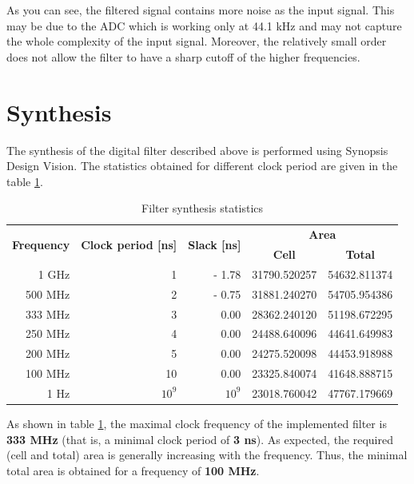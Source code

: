 As you can see, the filtered signal contains more noise as the input signal. This may be due to the ADC which is working only at 44.1 kHz and may not capture the whole complexity of the input signal. Moreover, the relatively small order does not allow the filter to have a sharp cutoff of the higher frequencies.


\section{Synthesis}

The synthesis of the digital filter described above is performed using Synopsis Design Vision. The statistics obtained for different clock period are given in the table \ref{table:synthesisStats}.

\begin{table}[!h]
	\centering
	\begin{tabular}{|r|r|r|r|r|}
		\hline
		 \multirow{2}{*}{\textbf{Frequency}}
		 & \multirow{2}{*}{\textbf{Clock period [ns]}}
		 & \multirow{2}{*}{\textbf{Slack [ns]}} & \multicolumn{2}{c|}{\textbf{Area}} \\
		 \cline{4-5}
		 & & & \multicolumn{1}{c|}{\textbf{Cell}} & \multicolumn{1}{c|}{\textbf{Total}} \\
		\hline
		 1 GHz & 1 & - 1.78 & 31790.520257 & 54632.811374 \\
		 500 MHz & 2 & - 0.75 & 31881.240270 & 54705.954386 \\
		 \rowcolor{Blue}
		 333 MHz & 3 & 0.00 & 28362.240120 & 51198.672295 \\
		 250 MHz & 4 & 0.00 & 24488.640096 & 44641.649983 \\
		 200 MHz & 5 & 0.00 & 24275.520098 & 44453.918988 \\
		 \rowcolor{Green}
		 100 MHz & 10 & 0.00 & 23325.840074 & 41648.888715 \\
		 1 Hz & $10^{9}$ & ~$10^{9}$ & 23018.760042 & 47767.179669 \\
		\hline
	\end{tabular}
	\caption{Filter synthesis statistics}	
	\label{table:synthesisStats}
\end{table} 

As shown in table \ref{table:synthesisStats}, the maximal clock frequency of the implemented filter is \textbf{333 MHz} (that is, a minimal clock period of \textbf{3 ns}). As expected, the required (cell and total) area is generally increasing with the frequency. Thus, the minimal total area is obtained for a frequency of \textbf{100 MHz}.
